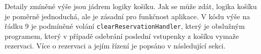 Detaily zmíněné výše jsou jádrem logiky košíku.
Jak se může zdát, logika košíku je poměrně jednoduchá, ale je zásadní pro funkčnost aplikace.
V kódu výše na řádku 9 je podmíněné volání \texttt{clearReservationHandler}, který je obslužným programem, který v případě odebrání poslední vstupenky z košíku vymaže rezervaci.
Více o rezervaci a jejím řízení je popsáno v následující sekci.
